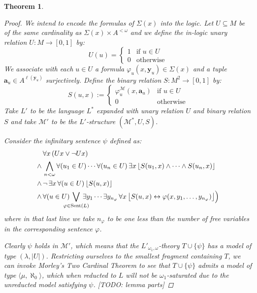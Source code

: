 \documentclass{amsart}
\newtheorem{theorem}{Theorem}[section]
\theoremstyle{definition}
\numberwithin{equation}{theorem}
\renewcommand{\phi}{\varphi}
\newcommand{\V}{\mathbf}
\newcommand{\strict}[1]{{\left\lfloor#1\right\rfloor}}
\newcommand{\narrow}[1]{\xrightarrow{#1}}
\renewcommand{\to}{\narrow{}}
\newcommand{\len}{\ell}
\begin{document}
\begin{theorem}
\begin{proof}
      We intend to encode the formulas of $\Sigma(x)$ into the logic.
      Let $U\subseteq M$ be of the same cardinality as $\Sigma(x)\times A^{<\omega}$ and we define the in-logic unary relation $U:M\to[0,1]$ by:
      \[
        U(u)=\left\{\begin{array}{ll}1&\text{if $u\in U$}\\0&\text{otherwise}\end{array}\right.
      \]
      We associate with each $u\in U$ a formula $\phi_u(x, \V y_u)\in\Sigma(x)$ and a tuple $\V a_u\in A^{\len(\V y_u)}$ surjectively.
      Define the binary relation $S:M^2\to[0,1]$ by:
      \[
        S(u, x):=\left\{\begin{array}{ll}
          \phi^\mathcal M_{u}(x,\V a_{u})&\text{if }u\in U\\
          0&\text{otherwise}
        \end{array}\right.
      \]
      Take $L'$ to be the language $L^*$ expanded with unary relation $U$ and binary relation $S$ and take $\mathcal M'$ to be the $L'$-structure $(\mathcal M^*,U,S)$.
      
      Consider the infinitary sentence $\psi$ defined as:
      \newcommand{\back}{\negthickspace\negthickspace}
      \begin{align*}
        &\forall x\, (Ux\vee\neg {U x})\\
        \wedge\,&\bigwedge_{n<\omega}\forall (u_1\in U)\cdots\forall (u_n\in U)\,\exists x\,\strict{S(u_1,x)\wedge\cdots\wedge S(u_n,x)}\\
        \wedge\,&\neg\,\exists x\,\forall(u\in U)\,\strict{S(u, x)}\\
        \wedge\,&\forall(u\in U)\back\back\bigvee_{\phi\in\text{Sent($L$)}}\back\back\exists y_1\cdots\exists y_{n_\phi}\,\forall x\,\strict{S(u, x)\leftrightarrow\phi(x, y_1,\dots,y_{n_\phi})}\Big)
      \end{align*}
      where in that last line we take $n_\phi$ to be one less than the number of free variables in the corresponding sentence $\phi$.
      
      Clearly $\psi$ holds in $\mathcal M'$, which means that the $L'_{\omega_1,\omega}$-theory $T\cup\{\psi\}$ has a model of type $(\lambda,|U|)$.
      Restricting ourselves to the smallest fragment containing $T$, we can invoke Morley's Two Cardinal Theorem to see that $T\cup\{\psi\}$ admits a model of type $\langle\mu,\aleph_0\rangle$, which when reducted to $L$ will not be $\omega_1$-saturated due to the unreducted model satisfying $\psi$.
      [TODO: lemma parts]
    \end{proof}
  \end{theorem}

\newpage
{}

\end{document}
